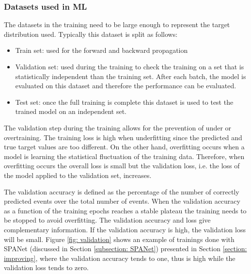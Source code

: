 \subsubsection{Datasets used in ML}

The datasets in the training need to be large enough to represent the target distribution used. Typically this dataset is split as follows:
\begin{itemize}
    \item Train set: used for the forward and backward propagation
    \item Validation set: used during the training to check the training on a set that is statistically independent than the training set. After each batch, the model is evaluated on this dataset and therefore the performance can be evaluated.
    \item Test set: once the full training is complete this dataset is used to test the trained model on an independent set.
\end{itemize}

The validation step during the training allows for the prevention of under or overtraining. The training loss is high when underfitting since the predicted and true target values are too different. On the other hand, overfitting occurs when a model is learning the statistical fluctuation of the training data. Therefore, when overfitting occurs the overall loss is small but the validation loss, i.e. the loss of the model applied to the validation set, increases. 



The validation accuracy is defined as the percentage of the number of correctly predicted events over the total number of events. When the validation accuracy as a function of the training epochs reaches a stable plateau the training needs to be stopped to avoid overfitting. The validation accuracy and loss give complementary information. If the validation accuracy is high, the validation loss will be small. Figure \ref{fig: validation} shows an example of trainings done with SPANet (discussed in Section \ref{subsection: SPANet}) presented in Section \ref{section: improving}, where the validation accuracy tends to one, thus is high while the validation loss tends to zero.

